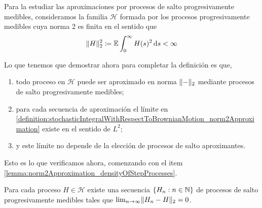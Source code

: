 Para la estudiar las aproximaciones por procesos de salto progresivamente medibles, consideramos la familia \(\mathcal{H}\) formada por los procesos progresivamente medibles cuya norma 2 es finita en el sentido que
\begin{align}
  \lVert H\rVert_2^2
  \coloneqq
  \operatorname{\mathbb{E}} \int_0^{\infty} H(s)^2 \mathop{}\!\mathrm{d} s
  <
  \infty
\end{align}

Lo que tenemos que demostrar ahora para completar la definición es que,
\begin{enumerate}
  \item
  \label{lemma:norm2Approximation_densityOfStepProcesses}
  todo proceso en \(\mathcal{H}\) puede ser aproximado en norma 
  \(\lVert-\rVert_2\) 
  mediante procesos de salto progresivamente medibles;
  \item
  \label{lemma:norm2Approximation_sequenceConvergence}
  para cada secuencia de aproximación el límite en \eqref{definition:stochasticIntegralWithRespectToBrownianMotion_norm2Approximation} existe en el sentido de \(L^2\);
  \item
  \label{lemma:norm2Approximation_limitUniqueness}
  y este límite no depende de la elección de procesos de salto aproximantes.
\end{enumerate} 
Esto es lo que verificamos ahora, comenzando con el item \ref{lemma:norm2Approximation_densityOfStepProcesses}.
\begin{lemma}
  Para cada proceso \(H \in \mathcal{H}\) existe una secuencia \(\{H_n : n \in \mathbb{N}\}\) de procesos de salto progresivamente medibles tales que \(\lim_{n \rightarrow \infty} \lVert H_n - H\rVert_2 = 0\).
\end{lemma}
